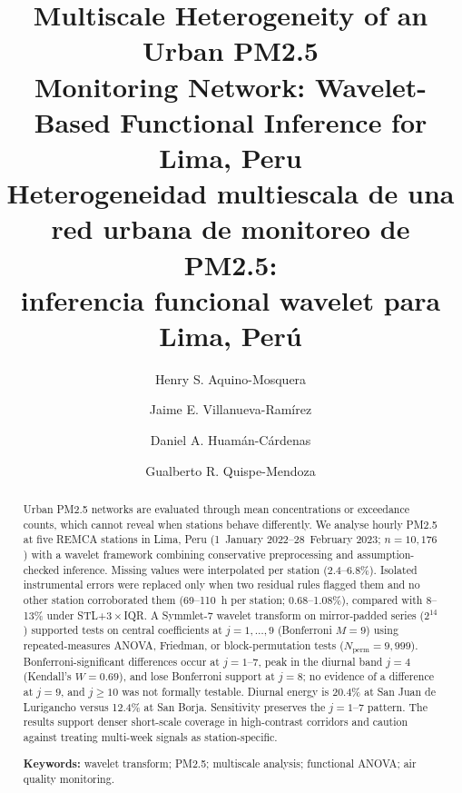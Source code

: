 \documentclass[12pt,letterpaper]{article}
\begin{document}
\linenumbers

\title{Multiscale Heterogeneity of an Urban PM2.5\\
Monitoring Network: Wavelet-Based Functional Inference for Lima, Peru\\[0.55em]
\large Heterogeneidad multiescala de una red urbana de monitoreo de PM2.5:\\
inferencia funcional wavelet para Lima, Per\'u}

\author[1]{Henry S. Aquino-Mosquera}
\author[2]{Jaime E. Villanueva-Ram\'irez}
\author[3]{Daniel A. Huam\'an-C\'ardenas}
\author[4]{Gualberto R. Quispe-Mendoza}


\date{}
\maketitle

\renewcommand{\abstractname}{Abstract}
\begin{abstract}
\noindent
Urban PM2.5 networks are evaluated through mean concentrations or exceedance counts, which cannot reveal when stations behave differently. We analyse hourly PM2.5 at five REMCA stations in Lima, Peru (1~January 2022--28~February 2023; $n=10{,}176$) with a wavelet framework combining conservative preprocessing and assumption-checked inference. Missing values were interpolated per station (2.4--6.8\%). Isolated instrumental errors were replaced only when two residual rules flagged them and no other station corroborated them (69--110~h per station; 0.68--1.08\%), compared with 8--13\% under STL+$3\times$IQR. A Symmlet-7 wavelet transform on mirror-padded series ($2^{14}$) supported tests on central coefficients at $j=1,\ldots,9$ (Bonferroni $M=9$) using repeated-measures ANOVA, Friedman, or block-permutation tests ($N_{\mathrm{perm}}=9{,}999$). Bonferroni-significant differences occur at $j=1$--$7$, peak in the diurnal band $j=4$ (Kendall's $W=0.69$), and lose Bonferroni support at $j=8$; no evidence of a difference at $j=9$, and $j\ge 10$ was not formally testable. Diurnal energy is 20.4\% at San Juan de Lurigancho versus 12.4\% at San Borja. Sensitivity preserves the $j=1$--$7$ pattern. The results support denser short-scale coverage in high-contrast corridors and caution against treating multi-week signals as station-specific.

\medskip
\noindent\textbf{Keywords:}
wavelet transform; PM2.5; multiscale analysis; functional ANOVA; air quality monitoring.
\end{abstract}
\end{document}
